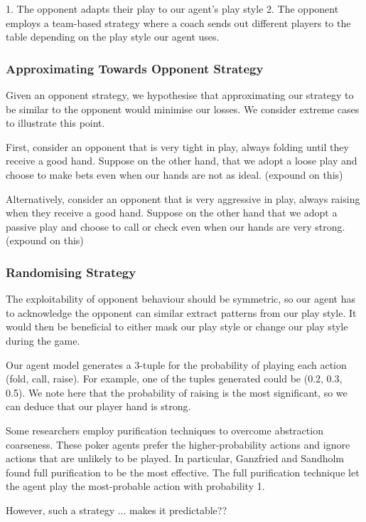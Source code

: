 \documentclass{article}
\begin{document}
1. The opponent adapts their play to our agent's play style
2. The opponent employs a team-based strategy where a coach sends out different players to the table depending on the play style our agent uses.

\subsubsection{Approximating Towards Opponent Strategy}

Given an opponent strategy, we hypothesise that approximating our strategy to be similar to the opponent would minimise our losses. We consider extreme cases to illustrate this point. 

First, consider an opponent that is very tight in play, always folding until they receive a good hand. Suppose on the other hand, that we adopt a loose play and choose to make bets even when our hands are not as ideal. (expound on this)

Alternatively, consider an opponent that is very aggressive in play, always raising when they receive a good hand. Suppose on the other hand that we adopt a passive play and choose to call or check even when our hands are very strong. (expound on this)

\subsubsection{Randomising Strategy}

The exploitability of opponent behaviour should be symmetric, so our agent has to acknowledge the opponent can similar extract patterns from our play style. It would then be beneficial to either mask our play style or change our play style during the game.

Our agent model generates a 3-tuple for the probability of playing each action (fold, call, raise). For example, one of the tuples generated could be (0.2, 0.3, 0.5). We note here that the probability of raising is the most significant, so we can deduce that our player hand is strong.

Some researchers employ purification techniques to overcome abstraction coarseness. These poker agents prefer the higher-probability actions and ignore actions that are unlikely to be played. In particular, Ganzfried and Sandholm found full purification to be the most effective. The full purification technique let the agent play the most-probable action with probability 1.

However, such a strategy ... makes it predictable??
\end{document}
